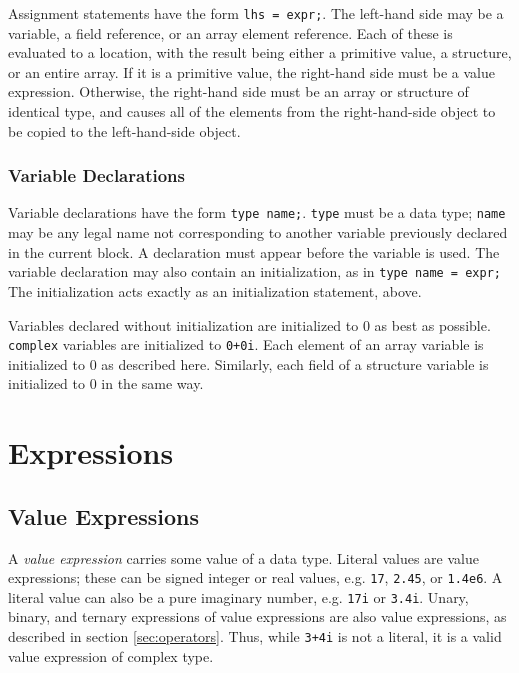 \documentclass[11pt]{article}
\begin{document}
Assignment statements have the form \lstinline|lhs = expr;|.  The left-hand
side may be a variable, a field reference, or an array element
reference.  Each of these is evaluated to a location, with the result
being either a primitive value, a structure, or an entire array.  If
it is a primitive value, the right-hand side must be a value
expression.  Otherwise, the right-hand side must be an array or
structure of identical type, and causes all of the elements from the
right-hand-side object to be copied to the left-hand-side object.

\subsubsection{Variable Declarations}

Variable declarations have the form \lstinline|type name;|.  \lstinline|type|
must be a data type; \lstinline|name| may be any legal name not
corresponding to another variable previously declared in the current
block.  A declaration must appear before the variable is used.  The
variable declaration may also contain an initialization, as in
\lstinline|type name = expr;|  The initialization acts exactly as an
initialization statement, above.

Variables declared without initialization are initialized to 0 as best
as possible.  \lstinline|complex| variables are initialized to
\lstinline|0+0i|.  Each element of an array variable is initialized to
0 as described here.  Similarly, each field of a structure variable is
initialized to 0 in the same way.


\section{Expressions}

\subsection{Value Expressions}
\label{sec:expr-value}

A \emph{value expression} carries some value of a data type.  Literal
values are value expressions; these can be signed integer or real
values, e.g. \lstinline|17|, \lstinline|2.45|, or \lstinline|1.4e6|.  A literal value
can also be a pure imaginary number, e.g. \lstinline|17i| or \lstinline|3.4i|.
Unary, binary, and ternary expressions of value expressions are also
value expressions, as described in section \ref{sec:operators}.  Thus,
while \lstinline|3+4i| is not a literal, it is a valid value expression of
complex type.
\end{document}
